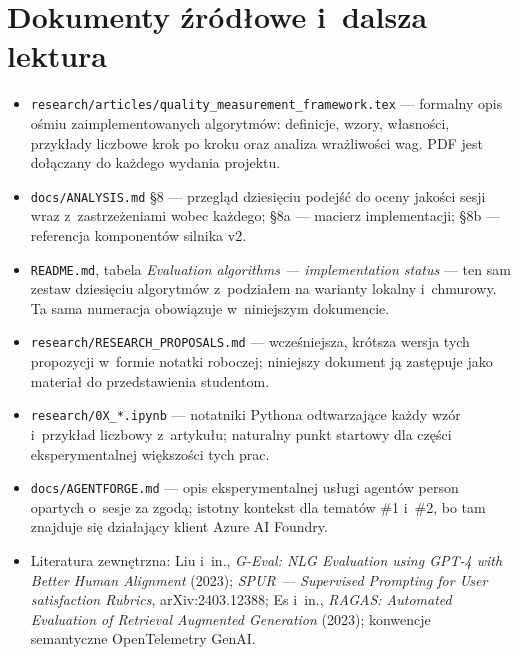 \documentclass[11pt,a4paper]{article}
\begin{document}
\clearpage
\section*{Dokumenty źródłowe i~dalsza lektura}

\begin{itemize}
  \item \texttt{research/articles/quality\_measurement\_framework.tex} ---
        formalny opis ośmiu zaimplementowanych algorytmów: definicje, wzory,
        własności, przykłady liczbowe krok po kroku oraz analiza wrażliwości wag.
        PDF jest dołączany do każdego wydania projektu.
  \item \texttt{docs/ANALYSIS.md} §8 --- przegląd dziesięciu podejść do oceny
        jakości sesji wraz z~zastrzeżeniami wobec każdego; §8a --- macierz
        implementacji; §8b --- referencja komponentów silnika v2.
  \item \texttt{README.md}, tabela \textit{Evaluation algorithms --- implementation
        status} --- ten sam zestaw dziesięciu algorytmów z~podziałem na warianty
        lokalny i~chmurowy. Ta sama numeracja obowiązuje w~niniejszym dokumencie.
  \item \texttt{research/RESEARCH\_PROPOSALS.md} --- wcześniejsza, krótsza wersja
        tych propozycji w~formie notatki roboczej; niniejszy dokument ją zastępuje
        jako materiał do przedstawienia studentom.
  \item \texttt{research/0X\_*.ipynb} --- notatniki Pythona odtwarzające każdy
        wzór i~przykład liczbowy z~artykułu; naturalny punkt startowy dla części
        eksperymentalnej większości tych prac.
  \item \texttt{docs/AGENTFORGE.md} --- opis eksperymentalnej usługi agentów
        person opartych o~sesje za zgodą; istotny kontekst dla tematów \#1 i~\#2,
        bo tam znajduje się działający klient Azure AI Foundry.
  \item Literatura zewnętrzna: Liu i~in., \textit{G-Eval: NLG Evaluation using
        GPT-4 with Better Human Alignment} (2023); \textit{SPUR --- Supervised
        Prompting for User satisfaction Rubrics}, arXiv:2403.12388;
        Es i~in., \textit{RAGAS: Automated Evaluation of Retrieval Augmented
        Generation} (2023); konwencje semantyczne OpenTelemetry GenAI.
\end{itemize}
\end{document}
